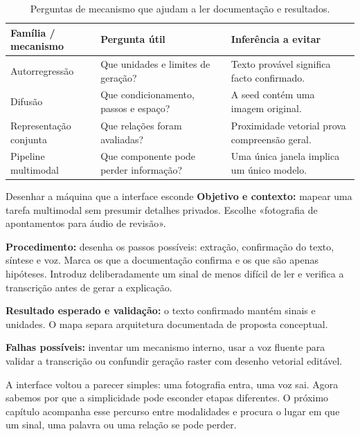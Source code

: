 \begin{table}[htbp]
\small
\begin{tabularx}{\textwidth}{@{}lXX@{}}
\toprule
Família / mecanismo & Pergunta útil & Inferência a evitar \\
\midrule
Autorregressão & Que unidades e limites de geração? & Texto provável significa facto confirmado. \\
Difusão & Que condicionamento, passos e espaço? & A seed contém uma imagem original. \\
Representação conjunta & Que relações foram avaliadas? & Proximidade vetorial prova compreensão geral. \\
Pipeline multimodal & Que componente pode perder informação? & Uma única janela implica um único modelo. \\
\bottomrule
\end{tabularx}
\caption{Perguntas de mecanismo que ajudam a ler documentação e resultados.}
\end{table}

\begin{promptlabbox}{Desenhar a máquina que a interface esconde}
\textbf{Objetivo e contexto:} mapear uma tarefa multimodal sem presumir detalhes privados. Escolhe «fotografia de apontamentos para áudio de revisão».

\textbf{Procedimento:} desenha os passos possíveis: extração, confirmação do texto, síntese e voz. Marca os que a documentação confirma e os que são apenas hipóteses. Introduz deliberadamente um sinal de menos difícil de ler e verifica a transcrição antes de gerar a explicação.

\textbf{Resultado esperado e validação:} o texto confirmado mantém sinais e unidades. O mapa separa arquitetura documentada de proposta conceptual.

\textbf{Falhas possíveis:} inventar um mecanismo interno, usar a voz fluente para validar a transcrição ou confundir geração raster com desenho vetorial editável.
\end{promptlabbox}

A interface voltou a parecer simples: uma fotografia entra, uma voz sai. Agora sabemos por que a simplicidade pode esconder etapas diferentes. O próximo capítulo acompanha esse percurso entre modalidades e procura o lugar em que um sinal, uma palavra ou uma relação se pode perder.

